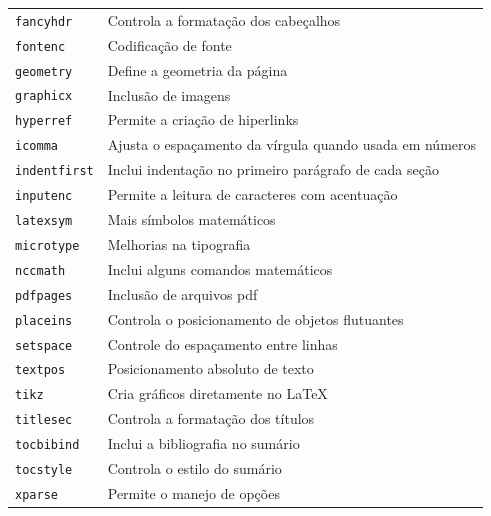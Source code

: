 \documentclass[fleqn]{icat-ufal}
\begin{document}
\begin{center}
\begin{longtable}{ll}
        \lstinline!fancyhdr!    & Controla a formatação dos cabeçalhos                         \\ 
        \lstinline!fontenc!     & Codificação de fonte                                         \\
        \lstinline!geometry!    & Define a geometria da página                                 \\
        \lstinline!graphicx!    & Inclusão de imagens                                          \\
        \lstinline!hyperref!    & Permite a criação de hiperlinks                              \\
        \lstinline!icomma!      & Ajusta o espaçamento da vírgula quando usada em números      \\
        \lstinline!indentfirst! & Inclui indentação no primeiro parágrafo de cada seção        \\
        \lstinline!inputenc!    & Permite a leitura de caracteres com acentuação               \\
        \lstinline!latexsym!    & Mais símbolos matemáticos                                    \\
        \lstinline!microtype!   & Melhorias na tipografia                                      \\
        \lstinline!nccmath!     & Inclui alguns comandos matemáticos                           \\
        \lstinline!pdfpages!    & Inclusão de arquivos \textsf{pdf}                            \\
        \lstinline!placeins!    & Controla o posicionamento de objetos flutuantes              \\
        \lstinline!setspace!    & Controle do espaçamento entre linhas                         \\
        \lstinline!textpos!     & Posicionamento absoluto de texto                             \\
        \lstinline!tikz!        & Cria gráficos diretamente no \LaTeX                          \\
        \lstinline!titlesec!    & Controla a formatação dos títulos                            \\
        \lstinline!tocbibind!   & Inclui a bibliografia no sumário                             \\
        \lstinline!tocstyle!    & Controla o estilo do sumário                                 \\
        \lstinline!xparse!      & Permite o manejo de opções                                   \\
        \hline
    \end{longtable}
\end{center}
\end{document}
